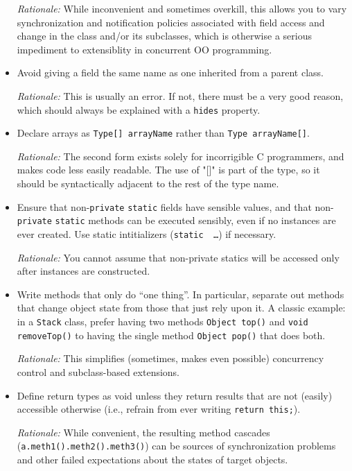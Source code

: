 \begin{itemize}
    \emph{Rationale:} While inconvenient and sometimes overkill, this allows you to vary synchronization and notification policies associated with field access and change in the class and/or its subclasses, which is otherwise a serious impediment to extensiblity in concurrent OO programming.

    \item 
    Avoid giving a field the same name as one inherited from a parent class.

    \emph{Rationale:} This is usually an error. If not, there must be a very good reason, which should always be explained with a \texttt{hides} property.

    \item 
    Declare arrays as \texttt{Type[] arrayName} rather than \texttt{Type arrayName[]}.

    \emph{Rationale:} The second form exists solely for incorrigible C programmers, and makes code less easily readable. The use of "[]" is part of the type, so it should be syntactically adjacent to the rest of the type name.

    \item
    Ensure that non-\texttt{private} \texttt{static} fields have sensible values, and that non-\texttt{private} \texttt{static} methods can be executed sensibly, even if no instances are ever created. Use static intitializers (\texttt{static { \ldots }}) if necessary.

    \emph{Rationale:} You cannot assume that non-private statics will be accessed only after instances are constructed.

    \item 
    Write methods that only do ``one thing''. In particular, separate out methods that change object state from those that just rely upon it. A classic example: in a \texttt{Stack} class, prefer having two methods \texttt{Object top()} and \texttt{void removeTop()} to having the single method \texttt{Object pop()} that does both.

    \emph{Rationale:} This simplifies (sometimes, makes even possible) concurrency control and subclass-based extensions.
    
    \item 
    Define return types as void unless they return results that are not (easily) accessible otherwise (i.e., refrain from ever writing \texttt{return this;}).

    \emph{Rationale:} While convenient, the resulting method cascades (\texttt{a.meth1().meth2().meth3()}) can be sources of synchronization problems and other failed expectations about the states of target objects.


\end{itemize}
